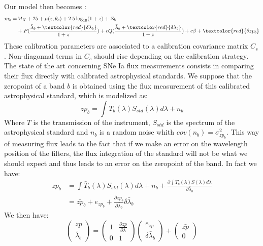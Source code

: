 \documentclass[\docopts]{\docclass}
\begin{document}
Our model then becomes :
\begin{equation}
\begin{split}
m_b = & M_X + 25 + \mu(z, \theta_\text{c}) + 2.5\log_{10}(1+z) + \mathcal{Z}_b \\
&+ P(\frac{\bar\lambda_b  + \textcolor{red}{\delta\lambda_b}}{1+z}) + cQ(\frac{\bar\lambda_b  + \textcolor{red}{\delta\lambda_b}}{1+z}) + {c\beta} + \textcolor{red}{\delta zp_b}
\end{split}
\end{equation}
These calibration parameters are associated to a calibration covariance matrix $C_s$.
Non-diagonnal terms in $C_s$ should rise depending on the calibration strategy.
The state of the art concerning SNe Ia flux measurements consists in comparing their flux directly with calibrated astrophysical standards.
We suppose that the zeropoint of a band $b$ is obtained using the flux measurement of this calibrated astrophysical standard, which is modelized as:
\begin{equation}
zp_b = \int T_b(\lambda) S_{std}(\lambda) d\lambda + n_b
\end{equation}
Where $T$ is the transmission of the instrument, $S_{std}$ is the spectrum of the astrophysical standard and $n_b$ is a random noise whith $cov(n_b) = \sigma_{zp_b}^2$.
This way of measuring flux leads to the fact that if we make an error on the wavelength position of the filters, the flux integration of the standard will not be what we should expect and thus leads to an error on the zeropoint of the band.
In fact we have:
\begin{equation}
\begin{split}
zp_b &= \int \bar T_b(\lambda) S_{std}(\lambda) d\lambda + n_b + \frac{\partial \int{T_b(\lambda)S(\lambda)d\lambda}}{\partial \bar\lambda_b }\\
&= \bar{zp}_b + e_{zp_b} + \frac{\partial zp_b}{\partial \bar\lambda_b }\delta\bar\lambda_b 
\end{split}
\end{equation}
We then have:
\begin{equation}
\begin{pmatrix}
  zp \\
  \bar\lambda_b 
\end{pmatrix}
=
\begin{pmatrix}
  1 & \frac{\partial zp}{\partial \lambda} \\
  0 & 1
\end{pmatrix}
\begin{pmatrix}
  e_{zp} \\
  \delta\bar\lambda_b 
\end{pmatrix}
+
\begin{pmatrix}
  \bar{zp} \\
  0
\end{pmatrix}
\end{equation}
\end{document}
